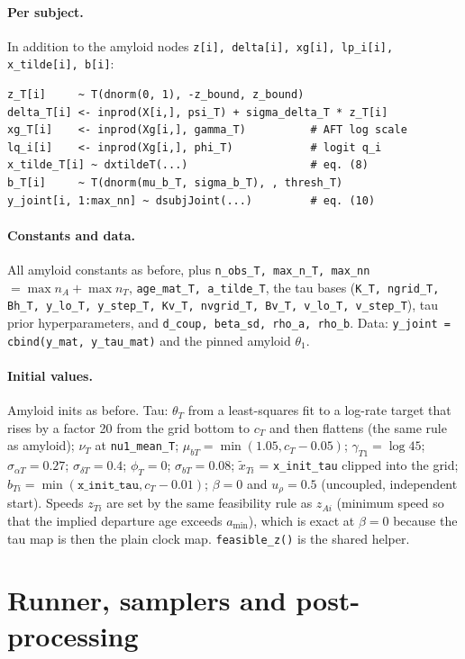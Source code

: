 \documentclass[11pt]{article}
\newcommand{\code}[1]{\texttt{#1}}
\begin{document}
\paragraph{Per subject.} In addition to the amyloid nodes
\code{z[i], delta[i], xg[i], lp\_i[i], x\_tilde[i], b[i]}:
\begin{lstlisting}
z_T[i]     ~ T(dnorm(0, 1), -z_bound, z_bound)
delta_T[i] <- inprod(X[i,], psi_T) + sigma_delta_T * z_T[i]
xg_T[i]    <- inprod(Xg[i,], gamma_T)          # AFT log scale
lq_i[i]    <- inprod(Xg[i,], phi_T)            # logit q_i
x_tilde_T[i] ~ dxtildeT(...)                   # eq. (8)
b_T[i]     ~ T(dnorm(mu_b_T, sigma_b_T), , thresh_T)
y_joint[i, 1:max_nn] ~ dsubjJoint(...)         # eq. (10)
\end{lstlisting}

\paragraph{Constants and data.} All amyloid constants as before, plus
\code{n\_obs\_T, max\_n\_T, max\_nn}$=\max n_A+\max n_T$, \code{age\_mat\_T,
a\_tilde\_T}, the tau bases (\code{K\_T, ngrid\_T, Bh\_T, y\_lo\_T, y\_step\_T, Kv\_T,
nvgrid\_T, Bv\_T, v\_lo\_T, v\_step\_T}), tau prior hyperparameters, and
\code{d\_coup, beta\_sd, rho\_a, rho\_b}. Data: \code{y\_joint = cbind(y\_mat,
y\_tau\_mat)} and the pinned amyloid $\theta_1$.

\paragraph{Initial values.} Amyloid inits as before. Tau: $\theta_T$ from a
least-squares fit to a log-rate target that rises by a factor 20 from the grid
bottom to $c_T$ and then flattens (the same rule as amyloid); $\nu_T$ at
\code{nu1\_mean\_T}; $\mu_{bT}=\min(1.05,c_T-0.05)$; $\gamma_{T1}=\log 45$;
$\sigma_{\alpha T}=0.27$; $\sigma_{\delta T}=0.4$; $\phi_T=0$; $\sigma_{bT}=0.08$;
$\tilde x_{Ti}$ = \code{x\_init\_tau} clipped into the grid; $b_{Ti}=\min(\code{x\_init\_tau},c_T-0.01)$;
$\beta=0$ and $u_\rho=0.5$ (uncoupled, independent start). Speeds $z_{Ti}$ are set
by the same feasibility rule as $z_{Ai}$ (minimum speed so that the implied
departure age exceeds $a_{\min}$), which is exact at $\beta=0$ because the tau map
is then the plain clock map. \code{feasible\_z()} is the shared helper.

\section{Runner, samplers and post-processing}\label{sec:runner}
\end{document}
